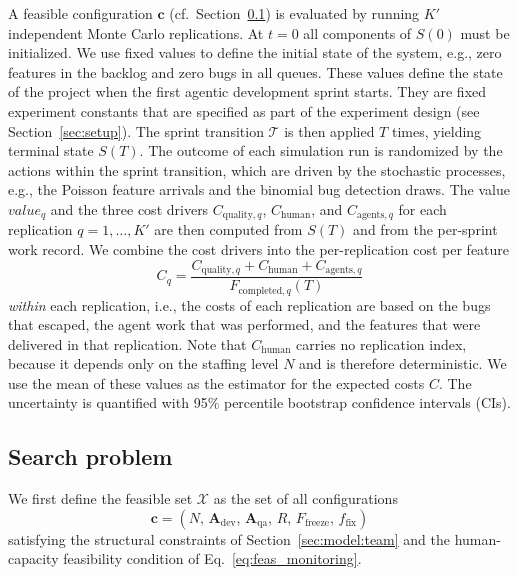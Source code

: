 \documentclass[smallextended]{svjour3}       %
\begin{document}
A feasible configuration $\mathbf{c}$ (cf.\ Section~\ref{sec:model:sosp}) is evaluated by running $K'$
independent Monte Carlo replications. At $t = 0$ all components of $S(0)$ must be initialized. We use fixed values to define the initial state of the system, e.g., zero features in the backlog and zero bugs in all queues.
These values define the state of the project when the first agentic development sprint
starts. They are fixed experiment constants that are
specified as part of the experiment design (see Section~\ref{sec:setup}). The
sprint transition $\mathcal{T}$ is then applied $T$ times, yielding terminal state
$S(T)$. The outcome of each simulation run is randomized by the actions within the sprint transition, which are driven by the stochastic processes, e.g., the Poisson feature arrivals and the binomial bug detection draws.
The value $\mathit{value}_q$ and the three cost drivers $C_{\mathrm{quality},q}$, $C_\mathrm{human}$, and $C_{\mathrm{agents},q}$ for each replication $q=1,\ldots,K'$ are then computed from $S(T)$ and from the per-sprint work record. We combine the cost drivers into the per-replication cost per feature
\begin{equation}
  C_q = \frac{C_{\mathrm{quality},q} + C_\mathrm{human} + C_{\mathrm{agents},q}}
             {F_{\mathrm{completed},q}(T)}
  \label{eq:cost_rep}
\end{equation}
\emph{within} each replication, i.e., the costs of each replication are based on the bugs that escaped, the agent work that was performed, and the features that were delivered in that replication. Note that $C_\mathrm{human}$ carries no replication index, because it depends only on the staffing level $N$ and is therefore deterministic. We use the mean of these values as the estimator for the expected costs $C$. The uncertainty is
quantified with 95\% percentile bootstrap confidence intervals (CIs).

\subsection{Search problem}
\label{sec:model:sosp}

We first define the feasible set $\mathcal{X}$ as the set of all configurations
\[
  \mathbf{c} = (N,\,\mathbf{A}_\mathrm{dev},\,\mathbf{A}_\mathrm{qa},\,R,\,F_\mathrm{freeze},\,f_\mathrm{fix})
\]
satisfying the structural constraints of Section~\ref{sec:model:team} and the
human-capacity feasibility condition of Eq.~\eqref{eq:feas_monitoring}.
\end{document}
